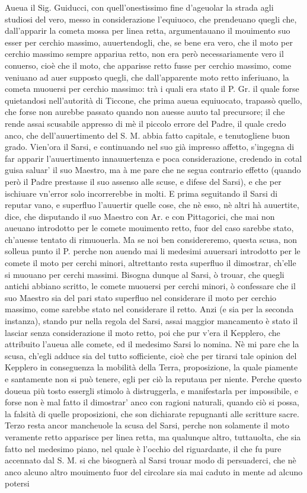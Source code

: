 \documentclass[11pt,twoside,openany]{book}
\begin{document}
Aueua il Sig. Guiducci, con quell'onestissimo fine d'ageuolar la strada agli studiosi del vero, messo in considerazione l'equiuoco, che prendeuano quegli che, dall'apparir la cometa mossa per linea retta, argumentauano il mouimento suo esser per cerchio massimo, auuertendogli, che, se bene era vero, che il moto per cerchio massimo sempre appariua retto, non era però necessariamente vero il conuerso, cioè che il moto, che apparisse retto fusse per cerchio massimo, come veniuano ad auer supposto quegli, che dall'apparente moto retto inferiuano, la cometa muouersi per cerchio massimo: trà i quali era stato il P. Gr. il quale forse quietandosi nell'autorità di Ticcone, che prima aueua equiuocato, trapassò quello, che forse non aurebbe passato quando non auesse auuto tal precursore; il che rende assai scusabile appresso di mè il piccolo errore del Padre, il quale credo anco, che dell'auuertimento del S. M. abbia fatto capitale, e tenutogliene buon grado. Vien'ora il Sarsi, e continuando nel suo già impresso affetto, s'ingegna di far apparir l'auuertimento innauuertenza e poca considerazione, credendo in cotal guisa saluar' il suo Maestro, ma à me pare che ne segua contrario effetto (quando però il Padre prestasse il suo assenso alle scuse, e difese del Sarsi), e che per ischiuare vn'error solo incorrerebbe in molti. E prima seguitando il Sarsi di reputar vano, e superfluo l'auuertir quelle cose, che nè esso, nè altri hà auuertite, dice, che disputando il suo Maestro con Ar. e con Pittagorici, che mai non aueuano introdotto per le comete mouimento retto, fuor del caso sarebbe stato, ch'auesse tentato di rimuouerla. Ma se noi ben considereremo, questa scusa, non solleua punto il P. perche non auendo mai li medesimi auuersari introdotto per le comete il moto per cerchi minori, altrettanto resta superfluo il dimostrar, ch'elle si muouano per cerchi massimi. Bisogna dunque al Sarsi, ò trouar, che quegli antichi abbiano scritto, le comete muouersi per cerchi minori, ò confessare che il suo Maestro sia del pari stato superfluo nel considerare il moto per cerchio massimo, come sarebbe stato nel considerare il retto. Anzi (e sia per la seconda instanza), stando pur nella regola del Sarsi, assai maggior mancamento è stato il lasciar senza considerazione il moto retto, poi che pur v'era il Kepplero, che attribuito l'aueua alle comete, ed il medesimo Sarsi lo nomina. Nè mi pare che la scusa, ch'egli adduce sia del tutto sofficiente, cioè che per tirarsi tale opinion del Kepplero in conseguenza la mobilità della Terra, proposizione, la quale piamente e santamente non si può tenere, egli per ciò la reputaua per niente. Perche questo doueua più tosto essergli stimolo à distruggerla, e manifestarla per impossibile, e forse non è mal fatto il dimostrar' anco con ragioni naturali, quando ciò si possa, la falsità di quelle proposizioni, che son dichiarate repugnanti alle scritture sacre. Terzo resta ancor mancheuole la scusa del Sarsi, perche non solamente il moto veramente retto apparisce per linea retta, ma qualunque altro, tuttauolta, che sia fatto nel medesimo piano, nel quale è l'occhio del riguardante, il che fu pure accennato dal S. M. si che bisognerà al Sarsi trouar modo di persuaderci, che nè anco alcuno altro mouimento fuor del circolare sia mai caduto in mente ad alcuno potersi 
\end{document}
